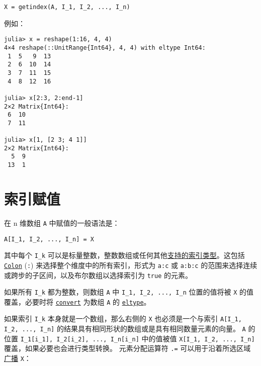 \begin{lstlisting}
X = getindex(A, I_1, I_2, ..., I_n)
\end{lstlisting}



例如：




\begin{verbatim}
julia> x = reshape(1:16, 4, 4)
4×4 reshape(::UnitRange{Int64}, 4, 4) with eltype Int64:
 1  5   9  13
 2  6  10  14
 3  7  11  15
 4  8  12  16

julia> x[2:3, 2:end-1]
2×2 Matrix{Int64}:
 6  10
 7  11

julia> x[1, [2 3; 4 1]]
2×2 Matrix{Int64}:
  5  9
 13  1
\end{verbatim}



\hypertarget{7105044708769418916}{}


\section{索引赋值}



在 n 维数组 \texttt{A} 中赋值的一般语法是：




\begin{lstlisting}
A[I_1, I_2, ..., I_n] = X
\end{lstlisting}



其中每个 \texttt{I\_k} 可以是标量整数，整数数组或任何其他\hyperlink{3335763678693018755}{支持的索引类型}。这包括 \hyperlink{13649361117037263099}{\texttt{Colon}} (\texttt{:}) 来选择整个维度中的所有索引，形式为 \texttt{a:c} 或 \texttt{a:b:c} 的范围来选择连续或跨步的子区间，以及布尔数组以选择索引为 \texttt{true} 的元素。



如果所有 \texttt{I\_k} 都为整数，则数组 \texttt{A} 中 \texttt{I\_1, I\_2, ..., I\_n} 位置的值将被 \texttt{X} 的值覆盖，必要时将 \hyperlink{1846942650946171605}{\texttt{convert}} 为数组 \texttt{A} 的 \hyperlink{6396209842929672718}{\texttt{eltype}}。



如果索引 \texttt{I\_k} 本身就是一个数组，那么右侧的 \texttt{X} 也必须是一个与索引 \texttt{A[I\_1, I\_2, ..., I\_n]} 的结果具有相同形状的数组或是具有相同数量元素的向量。 \texttt{A} 的位置 \texttt{I\_1[i\_1], I\_2[i\_2], ..., I\_n[i\_n]} 中的值被值 \texttt{X[I\_1, I\_2, ..., I\_n]} 覆盖，如果必要也会进行类型转换。 元素分配运算符 \texttt{.=} 可以用于沿着所选区域 \hyperlink{1924664524817847375}{广播} \texttt{X}：




